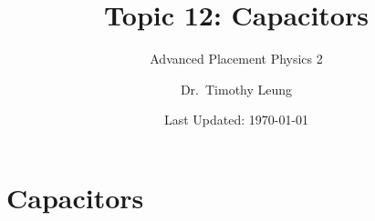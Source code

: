 \documentclass[12pt,aspectratio=169]{beamer}
\title{Topic 12: Capacitors}
\subtitle{Advanced Placement Physics 2}
\author[TML]{Dr.\ Timothy Leung}
\institute{Olympiads School}
\date{Last Updated: \today}
\newcommand{\mb}[1]{\mathbf{#1}}
\newcommand{\eq}[2]{\vspace{#1}{\Large\begin{displaymath}#2\end{displaymath}}}
\begin{document}
\begin{frame}
  \maketitle
\end{frame}


%



\section{Capacitors}


%
%
%  
%
\end{document}
